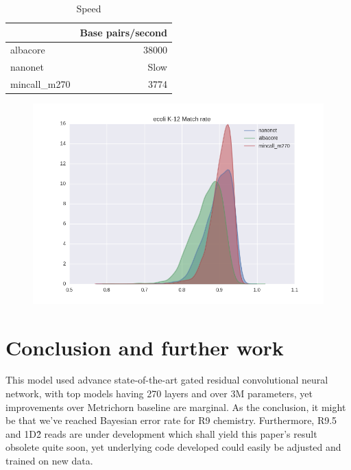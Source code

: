 \documentclass[runningheads,a4paper]{llncs}
\begin{document}
\begin{table}[h!]
\centering
\begin{tabular}{lr}
\toprule
{} &  Base pairs/second\\
\midrule
albacore      &      38000 \\
nanonet       &       Slow \\
mincall\_m270 &       3774 \\
\bottomrule
\end{tabular}
\caption{Speed}
\label{table:speed}
\end{table}

\begin{figure}[t]
\centering
\includegraphics[width=\textwidth]{ecoli_match}
\label{fig:ecoli_match}
\end{figure}



\section{Conclusion and further work}

This model used advance state-of-the-art gated residual convolutional neural network, with top models having 270 layers and over 3M parameters, yet improvements over Metrichorn baseline are marginal. As the conclusion, it might be that we've reached Bayesian error rate for R9 chemistry. Furthermore, R9.5 and 1D\^2 reads are under development which shall yield this paper's result obsolete quite soon, yet underlying code developed could easily be adjusted and trained on new data.
\end{document}
